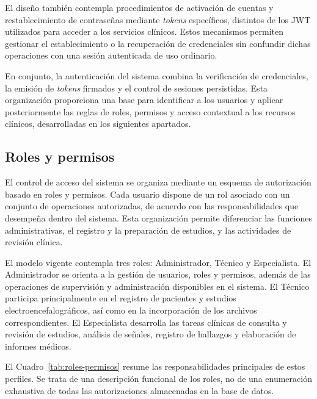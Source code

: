 El diseño también contempla procedimientos de activación de cuentas y restablecimiento de contraseñas mediante \textit{tokens} específicos, distintos de los JWT utilizados para acceder a los servicios clínicos. Estos mecanismos permiten gestionar el establecimiento o la recuperación de credenciales sin confundir dichas operaciones con una sesión autenticada de uso ordinario.

En conjunto, la autenticación del sistema combina la verificación de credenciales, la emisión de \textit{tokens} firmados y el control de sesiones persistidas. Esta organización proporciona una base para identificar a los usuarios y aplicar posteriormente las reglas de roles, permisos y acceso contextual a los recursos clínicos, desarrolladas en los siguientes apartados.


\subsection{Roles y permisos}
\label{subsec:roles-permisos}

El control de acceso del sistema se organiza mediante un esquema de autorización basado en roles y permisos. Cada usuario dispone de un rol asociado con un conjunto de operaciones autorizadas, de acuerdo con las responsabilidades que desempeña dentro del sistema. Esta organización permite diferenciar las funciones administrativas, el registro y la preparación de estudios, y las actividades de revisión clínica.

El modelo vigente contempla tres roles: Administrador, Técnico y Especialista. El Administrador se orienta a la gestión de usuarios, roles y permisos, además de las operaciones de supervisión y administración disponibles en el sistema. El Técnico participa principalmente en el registro de pacientes y estudios electroencefalográficos, así como en la incorporación de los archivos correspondientes. El Especialista desarrolla las tareas clínicas de consulta y revisión de estudios, análisis de señales, registro de hallazgos y elaboración de informes médicos.

El Cuadro~\ref{tab:roles-permisos} resume las responsabilidades principales de estos perfiles. Se trata de una descripción funcional de los roles, no de una enumeración exhaustiva de todas las autorizaciones almacenadas en la base de datos.

